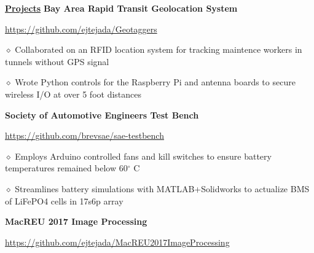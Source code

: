 \documentclass [11pt]{article}
\begin{document}
\begin{flushleft}
\underline{\textbf{Projects}}
\linebreak
\textbf{Bay Area Rapid Transit Geolocation System}\begin{minipage}{0.61 \linewidth}\begin{flushright}\href{https://github.com/ejtejada/Geotaggers}{https://github.com/ejtejada/Geotaggers}\end{flushright}\end{minipage}

‭‭\quad\quad\quad$\diamond$ Collaborated on an RFID location system for tracking maintence workers in tunnels without GPS signal

‭‭\quad\quad\quad$\diamond$ Wrote Python controls for the Raspberry Pi and antenna boards to secure wireless I/O at over 5 foot distances
%
‭‭%
%
‭‭%

\textbf{Society of Automotive Engineers Test Bench}\begin{minipage}{0.62 \linewidth}\begin{flushright}\href{https://github.com/brevsae/sae-testbench}{https://github.com/brevsae/sae-testbench}\end{flushright}\end{minipage}

\quad\quad\quad$\diamond$ Employs Arduino controlled fans and kill switches to ensure battery temperatures remained below 60$^{\circ}$ C

‭‭\quad\quad\quad$\diamond$ Streamlines battery simulations with MATLAB+Solidworks to actualize BMS of LiFePO4 cells in 17s6p array

\textbf{MacREU 2017 Image Processing}\begin{minipage}{0.71 \linewidth}\begin{flushright}\href{https://github.com/ejtejada/MacREU2017ImageProcessing}{https://github.com/ejtejada/MacREU2017ImageProcessing}\end{flushright}\end{minipage}


\end{flushleft}
\end{document}
